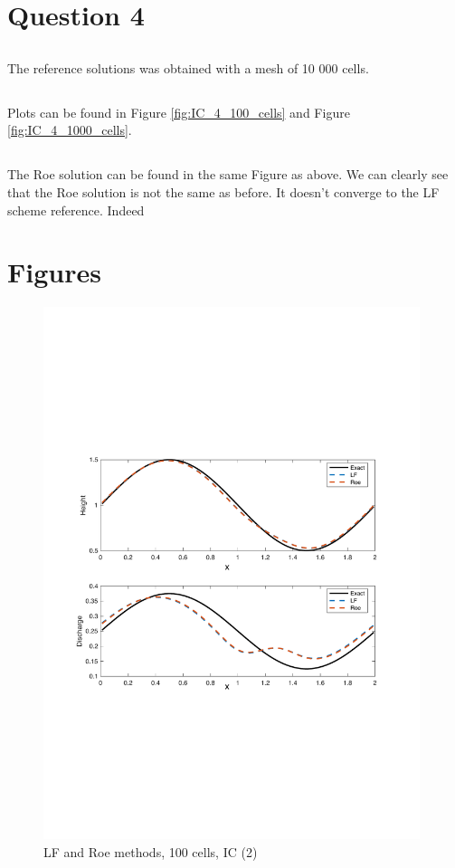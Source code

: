 \documentclass[11pt,a4paper]{article}
\begin{document}

\section{Question 4}

\subsection{}
The reference solutions was obtained with a mesh of 10 000 cells. 

\subsection{}
Plots can be found in Figure \ref{fig:IC_4_100_cells} and Figure \ref{fig:IC_4_1000_cells}. 
\subsection{}
The Roe solution can be found in the same Figure as above. We can clearly see that the Roe solution is not the same as before. It doesn't converge to the LF scheme reference. Indeed 

\newpage
\section{Figures}
\begin{figure}[!htb]
    \centering
    \includegraphics[width=11cm]{pictures/IC_1_100_cells.pdf}
    \caption{LF and Roe methods, 100 cells, IC (2)}
    \label{fig:IC_1_100_cells}
\end{figure}
\end{document}
